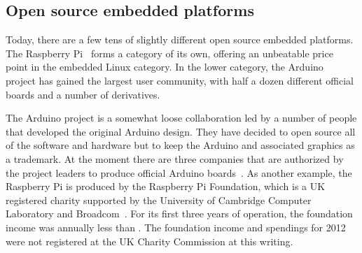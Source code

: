 \documentclass[final]{siamltex}
\begin{document}


\subsection{Open source embedded platforms}
\label{ssec:platforms}

Today, there are a few tens of slightly different open source embedded
platforms.  The Raspberry Pi~\cite{RasPi} forms a category of its own,
offering an unbeatable price point in the embedded Linux category.  In
the lower category, the Arduino~\cite{ArduinoProject,hribernik2011co}
project has gained the largest user community, with half a dozen
different official boards and a number of derivatives.

The Arduino project is a somewhat loose collaboration led by a number of
people that developed the original Arduino design.  They have decided
to open source all of the software and hardware but to keep the
Arduino and associated graphics as a trademark.  At the moment there are
three companies that are authorized by the project leaders to produce
official Arduino boards~\cite{ArduinoPolicy}.  
As another example,
the Raspberry Pi is produced by the Raspberry Pi Foundation, which is
a UK registered charity 
supported by the University of Cambridge Computer
Laboratory and Broadcom~\cite{RaspiFoundationWikipedia}.  For its
first three years of operation, the foundation income was annually
less than .  The foundation income and spendings for 2012
were not registered at the UK Charity Commission at this writing.
\end{document}
